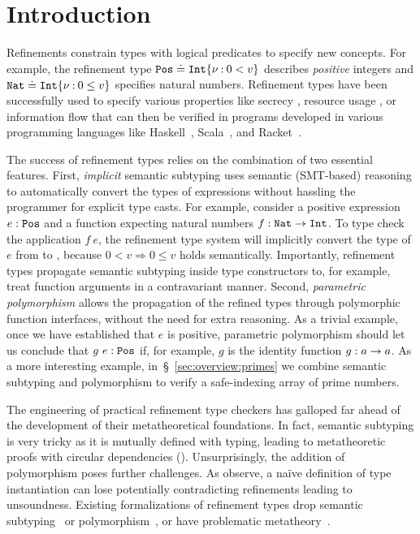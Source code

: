 \chapter{Introduction}
\label{ch:intro}

Refinements constrain types with logical predicates
to specify new concepts.
%
For example, the refinement type
$\texttt{Pos} \doteq {\ensuremath{{\texttt{Int}}\{\nu \mathbin{:} 0 < v\}}}$
describes \emph{positive} integers
and $\texttt{Nat} \doteq {\ensuremath{{\texttt{Int}}\{\nu \mathbin{:} 0 \leq v\}}}$
specifies natural numbers.
%
Refinement types have been successfully
used to specify various properties
like secrecy \citep{FournetCCS11},
resource usage \citep{Knoth20}, or
information flow \citep{STORM}
that can then be verified in programs
developed in various programming
languages like Haskell~\citep{Vazou14},
Scala~\citep{kuncak-stainless}, and
Racket~\citep{RefinedRacket}.

%
The success of refinement types
relies on the combination of two
essential features.
%
First, \textit{implicit} semantic
subtyping uses semantic (SMT-based)
reasoning to automatically convert
the types of expressions without
hassling the programmer for explicit type
casts.
%
For example, consider a positive expression
$e : \texttt{Pos}$ and a function expecting natural
numbers $f:\texttt{Nat} \rightarrow \texttt{Int}$.
%
To type check the application $f\ e$,
the refinement type system will implicitly
convert the type of $e$ from \tpos to \tnat,
because $0 < v \Rightarrow 0 \leq v$
holds semantically.
%
Importantly, refinement types propagate
semantic subtyping inside type constructors
to, for example, treat function arguments in
a contravariant manner.
%
Second, \textit{parametric polymorphism}
allows the propagation of the refined types
through polymorphic function interfaces,
without the need for extra reasoning.
%
As a trivial example, once we have
established that $e$ is positive,
parametric polymorphism should let
us conclude that $g\ e : \texttt{Pos}$ if,
for example, $g$ is the identity function
$g:a \rightarrow a$.
As a more interesting example, in~\S~\ref{sec:overview:primes}     %
we combine semantic subtyping and polymorphism
to verify a safe-indexing array of prime numbers.

The engineering of practical refinement
type checkers has galloped far ahead of
the development of their metatheoretical
foundations.
%
In fact, semantic subtyping is very tricky
as it is mutually defined with typing,
leading to metatheoretic proofs with
circular dependencies ().
%
Unsurprisingly, the addition of polymorphism
poses further challenges.
%
As \citet{SekiyamaIG17} observe, a na\"ive definition
of type instantiation can lose potentially contradicting
refinements leading to unsoundness.
%
Existing formalizations of refinement types
drop semantic subtyping~\citep{SekiyamaIG17,kuncak-stainless}
or polymorphism~\citep{flanagan06, newfstar},
or have problematic metatheory~\citep{Belo11}.

